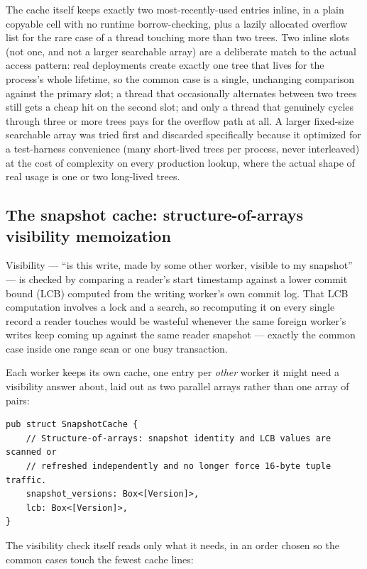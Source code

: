 \documentclass[11pt]{article}
\begin{document}
The cache itself keeps exactly two most-recently-used entries inline, in a plain
copyable cell with no runtime borrow-checking, plus a lazily allocated overflow list
for the rare case of a thread touching more than two trees. Two inline slots (not
one, and not a larger searchable array) are a deliberate match to the actual access
pattern: real deployments create exactly one tree that lives for the process's whole
lifetime, so the common case is a single, unchanging comparison against the primary
slot; a thread that occasionally alternates between two trees still gets a cheap
hit on the second slot; and only a thread that genuinely cycles through three or
more trees pays for the overflow path at all. A larger fixed-size searchable array
was tried first and discarded specifically because it optimized for a
test-harness convenience (many short-lived trees per process, never interleaved)
at the cost of complexity on every production lookup, where the actual shape of
real usage is one or two long-lived trees.

\subsection{The snapshot cache: structure-of-arrays visibility memoization}

Visibility --- ``is this write, made by some other worker, visible to my
snapshot'' --- is checked by comparing a reader's start timestamp against a lower
commit bound (LCB) computed from the writing worker's own commit log. That LCB
computation involves a lock and a search, so recomputing it on every single record a
reader touches would be wasteful whenever the same foreign worker's writes keep
coming up against the same reader snapshot --- exactly the common case inside one
range scan or one busy transaction.

Each worker keeps its own cache, one entry per \emph{other} worker it might need a
visibility answer about, laid out as two parallel arrays rather than one array of
pairs:

\begin{lstlisting}
pub struct SnapshotCache {
    // Structure-of-arrays: snapshot identity and LCB values are scanned or
    // refreshed independently and no longer force 16-byte tuple traffic.
    snapshot_versions: Box<[Version]>,
    lcb: Box<[Version]>,
}
\end{lstlisting}

The visibility check itself reads only what it needs, in an order chosen so the
common cases touch the fewest cache lines:
\end{document}
